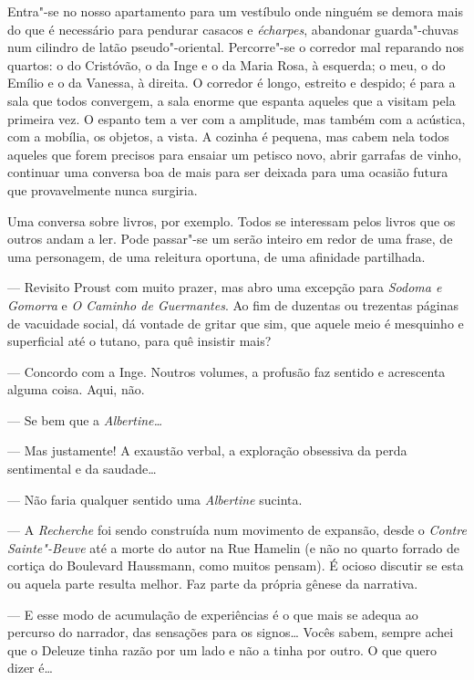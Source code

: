 Entra"-se no nosso apartamento para um vestíbulo onde ninguém se demora
mais do que é necessário para pendurar casacos e \emph{écharpes},
abandonar guarda"-chuvas num cilindro de latão pseudo"-oriental.
Percorre"-se o corredor mal reparando nos quartos: o do Cristóvão, o da
Inge e o da Maria Rosa, à esquerda; o meu, o do Emílio e o da Vanessa, à
direita. O corredor é longo, estreito e despido; é para a sala que todos
convergem, a sala enorme que espanta aqueles que a visitam pela primeira
vez. O espanto tem a ver com a amplitude, mas também com a acústica, com
a mobília, os objetos, a vista. A cozinha é pequena, mas cabem nela
todos aqueles que forem precisos para ensaiar um petisco novo, abrir
garrafas de vinho, continuar uma conversa boa de mais para ser deixada
para uma ocasião futura que provavelmente nunca surgiria.

Uma conversa sobre livros, por exemplo. Todos se interessam pelos
livros que os outros andam a ler. Pode passar"-se um serão inteiro em
redor de uma frase, de uma personagem, de uma releitura oportuna, de uma
afinidade partilhada.

--- Revisito Proust com muito prazer, mas abro uma excepção para
  \emph{Sodoma e Gomorra }e \emph{O Caminho de Guermantes}. Ao fim de
  duzentas ou trezentas páginas de vacuidade social, dá vontade de
  gritar que sim, que aquele meio é mesquinho e
superficial até o tutano, para quê insistir mais?

--- Concordo com a Inge. Noutros volumes, a profusão faz sentido e
  acrescenta alguma coisa. Aqui, não.

--- Se bem que a \emph{Albertine\ldots{}}

--- Mas justamente! A exaustão verbal, a exploração obsessiva da perda
  sentimental e da saudade\ldots{}

--- Não faria qualquer sentido uma \emph{Albertine }sucinta.

--- A \emph{Recherche }foi sendo construída num movimento de expansão,
  desde o \emph{Contre Sainte"-Beuve }até a morte do autor na Rue Hamelin
  (e não no quarto forrado de cortiça do Boulevard Haussmann, como
  muitos pensam). É ocioso discutir se esta ou aquela parte resulta
  melhor. Faz parte da própria gênese da narrativa.

--- E esse modo de acumulação de experiências é o que mais se adequa ao
  percurso do narrador, das sensações para os signos\ldots{} Vocês sabem,
  sempre achei que o Deleuze tinha razão por um lado e não a tinha por
  outro. O que quero dizer é\ldots{}

